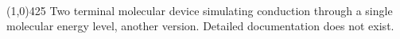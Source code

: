 \documentclass{article}
\begin{document}
\\
\hrulefill\linethickness{0.5mm}\line(1,0){425} \normalsize
\newline
Two terminal molecular device simulating conduction through a single molecular energy level, another version. Detailed documentation does not exist.
\end{document}
